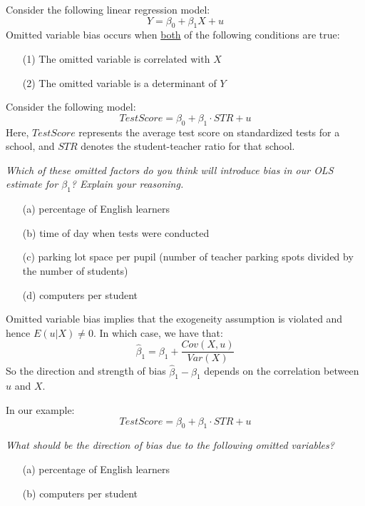 \documentclass{./../../Latex/handout}
\begin{document}
\thispagestyle{plain}
\vspace{-1em}

Consider the following linear regression model:
$$ Y = \beta_0 + \beta_1 X + u  $$
Omitted variable bias occurs when \underline{both} of the following conditions are true: 
\begin{itemize}
  \item[(1)] The omitted variable is correlated with $X$
  \item[(2)] The omitted variable is a determinant of $Y$
\end{itemize}

Consider the following model:
$$ Test Score = \beta_0 + \beta_1 \cdot STR + u $$
Here, \( Test Score \) represents the average test score on standardized tests for a school, and \( STR \) denotes the student-teacher ratio for that school.

\textit{Which of these omitted factors do you think will introduce bias in our OLS estimate for \( \beta_1 \)? Explain your reasoning.}
\begin{itemize}
  \item[(a)] percentage of English learners
  \item[(b)] time of day when tests were conducted
  \item[(c)] parking lot space per pupil (number of teacher parking spots divided by the number of students)
  \item[(d)] computers per student
\end{itemize}


\newpage
Omitted variable bias implies that the exogeneity assumption is violated and hence $E(u|X)\neq 0$. In which case, we have that:
$$ \hat{\beta}_1 = \beta_1 +  \frac{Cov(X,u)}{Var(X)} $$
So the direction and strength of bias $\hat{\beta}_1- \beta_1$ depends on the correlation between $u$ and $X$. 

In our example:
$$ Test Score = \beta_0 + \beta_1 \cdot STR + u $$

\textit{What should be the direction of bias due to the following omitted variables?}  
\begin{itemize}
  \item[(a)] percentage of English learners
  \item[(b)] computers per student
\end{itemize}
\end{document}
